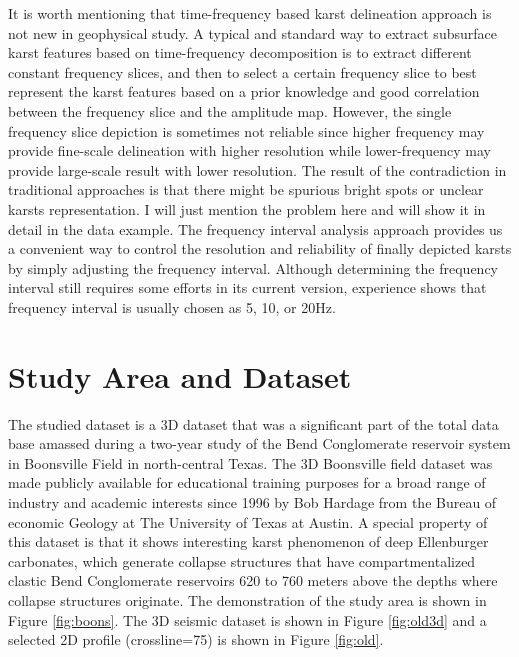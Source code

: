 It is worth mentioning that time-frequency based karst delineation approach is not new in geophysical study. A typical and standard way to extract subsurface karst features based on time-frequency decomposition is to extract different constant frequency slices, and then to select a certain frequency slice to best represent the karst features based on a prior knowledge and good correlation between the frequency slice and the amplitude map. However, the single frequency slice depiction is sometimes not  reliable since higher frequency may provide fine-scale delineation with higher resolution\new{,} while lower-frequency may provide large-scale result with lower resolution. The result of the contradiction in traditional approaches is that there might be spurious bright spots or unclear karsts representation. I will just mention the problem here and will show it in detail in the data example. The frequency interval analysis approach provides us a convenient way to control the resolution and reliability of finally depicted karsts by simply adjusting the frequency interval. Although determining the frequency interval still requires some efforts in its current version,  experience shows that frequency interval is usually chosen as 5, 10, or 20Hz.

\section{Study Area and Dataset}
The studied dataset is a 3D dataset that was a significant part of the total data base amassed during a two-year study of the Bend Conglomerate reservoir system in Boonsville Field in north-central Texas. The 3D Boonsville field dataset  was made publicly available for educational training purposes for a broad range of industry and academic interests since 1996 by Bob Hardage from the Bureau of economic Geology at The University of Texas at Austin. A special property of this dataset is that it shows interesting karst phenomenon of deep Ellenburger carbonates, which generate collapse structures that have compartmentalized clastic Bend Conglomerate reservoirs 620 to 760 meters above the depths where collapse structures originate. The demonstration of the study area is shown in Figure \ref{fig:boons}.  The 3D seismic dataset is shown in Figure \ref{fig:old3d} and a selected 2D profile (crossline=75) is shown in Figure \ref{fig:old}.  


